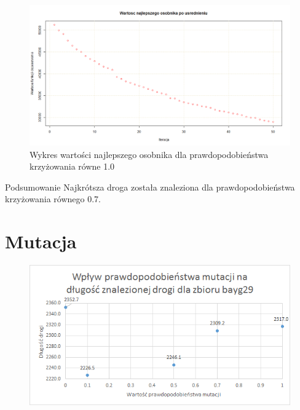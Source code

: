 \documentclass{article}
\begin{document}
\begin{figure}[H]
\centering

\includegraphics[scale=0.3]{IO_obrazy/US50_krz_1}
\caption{Wykres wartości najlepszego osobnika dla prawdopodobieństwa krzyżowania równe 1.0}
\end{figure}

Podsumowanie Najkrótsza droga została znaleziona dla prawdopodobieństwa krzyżowania równego 0.7. 



\newpage

\section{Mutacja}


\begin{figure}[H]
\centering

\includegraphics[scale=0.9]{IO_obrazy/excel_bayg29_mut}
\end{figure}
\end{document}
